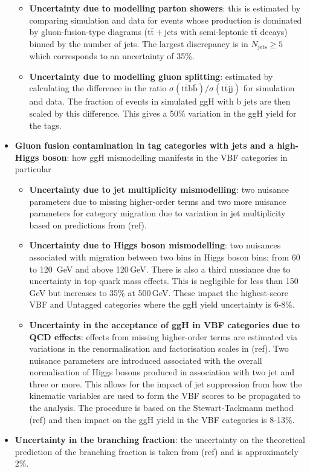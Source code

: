 \begin{itemize}[noitemsep]
{\begin{itemize}[noitemsep]
            \item[\textbullet] \textbf{Uncertainty due to modelling parton showers}: this is estimated by comparing simulation and data for events whose production is dominated by gluon-fusion-type diagrams ($\mathrm{t}\bar{\mathrm{t}}+\mathrm{jets}$ with semi-leptonic $\mathrm{t}\bar{\mathrm{t}}$ decays) binned by the number of jets. The largest discrepancy is in $N_{\mathrm{jets}}\geq{5}$ which corresponds to an uncertainty of 35\%.
            \item[\textbullet] \textbf{Uncertainty due to modelling gluon splitting}: estimated by calculating the difference in the ratio $\sigma(\mathrm{t\bar{t}b\bar{b}})/\sigma(\mathrm{t\bar{t}jj})$ for simulation and data. The fraction of events in simulated ggH with b jets are then scaled by this difference. This gives a 50\% variation in the ggH yield for the \ttH tags. 
        \end{itemize}}
    \item{\textbf{Gluon fusion contamination in tag categories with jets and a high-\pt Higgs boson}: how ggH mismodelling manifests in the VBF categories in particular 
        \begin{itemize}[noitemsep]
            \item[\textbullet] \textbf{Uncertainty due to jet multiplicity mismodelling}: two nuisance parameters due to missing higher-order terms and two more nuisance parameters for category migration due to variation in jet multiplicity based on predictions from (ref).
            \item[\textbullet] \textbf{Uncertainty due to Higgs boson \pt mismodelling}: two nuisances associated with migration between two bins in Higgs boson \pt bins; from 60 to 120 \,GeV and above 120\,GeV. There is also a third nussiance due to uncertainty in top quark mass effects. This is negligible for \pt less than 150\,GeV but increases to 35\% at 500\,GeV. These impact the highest-score VBF and Untagged categories where the ggH yield uncertainty is 6-8\%.
            \item[\textbullet] \textbf{Uncertainty in the acceptance of ggH in VBF categories due to QCD effects}: effects from missing higher-order terms are estimated via variations in the renormalisation and factorisation scales in (ref). Two nuisance parameters are introduced associated with the overall normalisation of Higgs bosons produced in association with two jet and three or more. This allows for the impact of jet suppression from how the kinematic variables are used to form the VBF scores to be propagated to the analysis. The procedure is based on the Stewart-Tackmann method (ref) and then impact on the ggH yield in the VBF categories is 8-13\%. 
        \end{itemize}}
    \item{\textbf{Uncertainty in the \Hgg branching fraction}: the uncertainty on the theoretical prediction of the \Hgg branching fraction is taken from (ref) and is approximately 2\%.}
\end{itemize}

